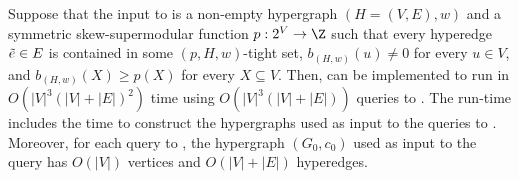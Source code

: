\begin{lemma}\label{lem:WeakToStrong:strongly-polytime:main}
Suppose that the input to  is a non-empty hypergraph $(H = (V, E), w)$ and a symmetric skew-supermodular function $p:2^V\rightarrow \Z$ such that every hyperedge $\Tilde{e} \in E$ is contained in some $(p, H, w)$-tight set, $b_{(H,w)}(u) \not = 0$ for every $u \in V$, and $b_{(H,w)}(X) \geq p(X)$ for every $X \subseteq V$.
 Then,   can be implemented to run in $O(|V|^3(|V| + |E|)^2)$ time using $O(|V|^3(|V|+|E|))$ queries to . The run-time includes the time to construct the hypergraphs used as input to the queries to .
Moreover, for each query to , the hypergraph $(G_0, c_0)$ used as input to the query has $O(|V|)$ vertices and $O(|V|+|E|)$ hyperedges.
\end{lemma}
